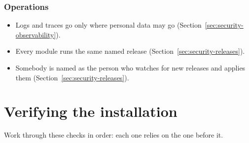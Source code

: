 \documentclass[11pt, a4paper]{article}
\newcommand{\elicitcheck}{\raisebox{-0.12em}{\setlength{\fboxsep}{0pt}\fbox{\rule{0pt}{0.72em}\hspace{0.72em}}}}
\begin{document}
\subsubsection*{Operations}
\begin{itemize}[label = \elicitcheck]
  \item Logs and traces go only where personal data may go
        (Section~\ref{sec:security-observability}).
  \item Every module runs the same named release (Section~\ref{sec:security-releases}).
  \item Somebody is named as the person who watches for new releases and applies them
        (Section~\ref{sec:security-releases}).
\end{itemize}

\section{Verifying the installation}
\label{sec:verify}

Work through these checks in order: each one relies on the one before it.
\end{document}
